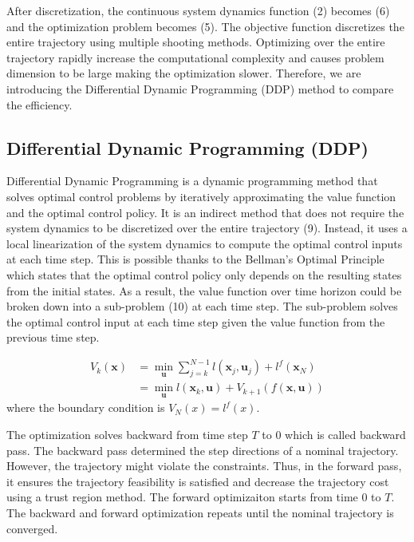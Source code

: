 \documentclass{article}
\begin{document}
After discretization, the continuous system dynamics function (2) becomes (6) and the optimization problem becomes (5). The objective function discretizes the entire trajectory using multiple shooting methods. Optimizing over the entire trajectory rapidly increase the computational complexity \cite{lantoine2012hybrid} and causes problem dimension to be large making the optimization slower. Therefore, we are introducing the Differential Dynamic Programming (DDP) method to compare the efficiency. 

\subsection{Differential Dynamic Programming (DDP)}

Differential Dynamic Programming is a dynamic programming method that solves optimal control problems by iteratively approximating the value function and the optimal control policy. It is an indirect method that does not require the system dynamics to be discretized over the entire trajectory (9). Instead, it uses a local linearization of the system dynamics to compute the optimal control inputs at each time step. This is possible thanks to the Bellman's Optimal Principle which states that the optimal control policy only depends on the resulting states from the initial states. As a result, the value function over time horizon could be broken down into a sub-problem (10) at each time step. The sub-problem solves the optimal control input at each time step given the value function from the previous time step. 

\begin{align}
    V_k(\textbf{x}) & = \min_{\textbf{u}} \sum^{N-1}_{j=k} l(\textbf{x}_j, \textbf{u}_j) + l^f(\textbf{x}_N) \\
    & = \min_{\textbf{u}} l(\textbf{x}_k, \textbf{u}) + V_{k+1}(f(\textbf{x}, \textbf{u})) 
\end{align}
where the boundary condition is $V_N(x) = l^f(x)$. 

The optimization solves backward from time step $T$ to 0 which is called backward pass. The backward pass determined the step directions of a nominal trajectory. However, the trajectory might violate the constraints. Thus, in the forward pass, it ensures the trajectory feasibility is satisfied and decrease the trajectory cost using a trust region method. The forward optimizaiton starts from time 0 to $T$. The backward and forward optimization repeats until the nominal trajectory is converged. 
\end{document}
